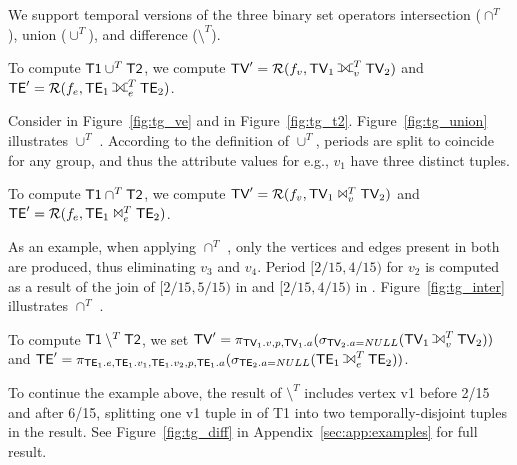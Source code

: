 We support temporal versions of the three binary set operators
intersection ($\cap^T$), union ($\cup^T$), and difference
($\setminus^T$).


To compute $\textsf{T1} \cup^T \textsf{T2}$, we compute $\tv' =
\resolve{f_v}{\tv_1 \fullouterjoin^T_{v} \tv_2}$ and $\te' =
\resolve{f_e}{\te_1 \fullouterjoin^T_{e} \te_2}$.

Consider  in Figure~\ref{fig:tg_ve} and  in
Figure~\ref{fig:tg_t2}.  Figure~\ref{fig:tg_union} illustrates
 $\cup^T$ .  According to the definition of
$\cup^T$, periods are split to coincide for any group, and thus the
attribute values for e.g., $v_1$ have three distinct tuples.

To compute $\textsf{T1} \cap^T \textsf{T2}$, we compute $\textsf{TV}' =
\mathcal{R}(f_v,\textsf{TV}_1 \Join^T_{v} \textsf{TV}_2)$ and $\textsf{TE}' =
\mathcal{R}(f_e,\textsf{TE}_1 \Join^T_{e} \textsf{TE}_2)$.

As an example, when applying  $\cap^T$ , only the
vertices and edges present in both \tgs are produced, thus eliminating
$v_3$ and $v_4$.  Period $[2/15, 4/15)$ for $v_2$ is computed as a
  result of the join of $[2/15, 5/15)$ in  and [$2/15,
      4/15)$ in .  Figure~\ref{fig:tg_inter} illustrates
       $\cap^T$ .

To compute $\textsf{T1} \setminus^T \textsf{T2}$, we set $\tv' =
\pi_{\tv_1.v,p,\tv_1.a} \allowbreak (\sigma_{\tv_2.a = NULL}(\tv_1
\leftouterjoin^T_{v} \tv_2))$ and $\te' =\\
\pi_{\te_1.e,\te_1.v_1, \te_1.v_2,p,\te_1.a} (\sigma_{\te_2.a =
  NULL}(\te_1 \leftouterjoin^T_{e} \te_2))$.

To continue the example above, the result of  $\setminus^T$
 includes vertex v1 before 2/15 and after 6/15, splitting
one v1 tuple in \tv of T1 into two temporally-disjoint tuples in the
result.  See Figure~\ref{fig:tg_diff} in
Appendix~\ref{sec:app:examples} for full result.

